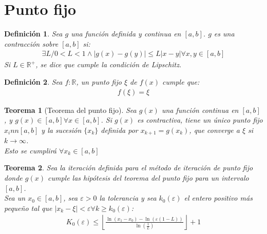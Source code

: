 \documentclass{article}
\newtheorem{theo}{Teorema}
\newtheorem{defin}{Definición}
\begin{document}
\section{Punto fijo}
\begin{defin}
    Sea $g$ una función definida y continua en $[a,b]$. $g$ es una contracción sobre $[a,b]$ si:
    \begin{equation}
        \begin{split}
            \exists L / 0 < L < 1 \wedge |g(x)-g(y)|\leq L \lvert x-y \rvert  \forall x,y \in [a,b]
        \end{split}
    \end{equation}
    Si $L \in \mathbb{R}^{+}$, se dice que cumple la condición de Lipschitz.
\end{defin}
\begin{defin}
    Sea $f: \mathbb{R}$, un punto fijo $\xi $ de $f(x)$ cumple que:
    \begin{equation}
        \begin{split}
            f(\xi ) = \xi 
        \end{split}
    \end{equation}
\end{defin}
\begin{theo}[Teorema del punto fijo]
    Sea $g(x)$ una función continua en $[a,b]$, y $g(x) \in  [a,b] \forall x \in [a,b]$. Si $g(x)$
    es contractiva, tiene un único punto fijo $x_{i}nn[a,b]$ y la sucesión $\{ x_{k} \}$ definida
    por $x_{k+1} = g(x_{k})$, que converge a $\xi $ si $k \to  \infty$.\\
    Esto se cumplirá $\forall x_{k} \in [a,b]$
\end{theo}
\begin{theo}
    Sea la iteración definida para el método de iteración de punto fijo donde $g(x)$ cumple las
    hipótesis del teorema del punto fijo para un intervalo $[a,b]$.\\
    Sea un $x_{0} \in [a,b]$, sea $\varepsilon > 0$ la tolerancia y sea $k_{0}(\varepsilon )$
    el entero positivo más pequeño tal que $|x_{k} - \xi | < \varepsilon  \forall k \geq k_{0}(\varepsilon )$:
    \begin{equation}
        \begin{split}
            K_{0}(\varepsilon ) \leq \left \lfloor{\frac{\ln(x_{1}-x_{0})-\ln (\varepsilon (1-L))}
            {\ln (\frac{1}{L})}}\right \rfloor +1
        \end{split}
    \end{equation}
\end{theo}
\end{document}
